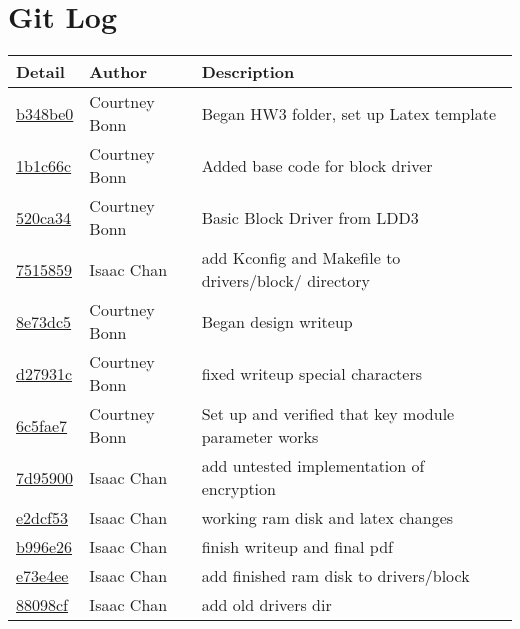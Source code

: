 \documentclass[letterpaper,10pt,draftclsnofoot,onecolumn,titlepage]{IEEEtran}
\begin{document}
\section{Git Log}
\begin{tabular}{p{2cm} p{2cm} p{10cm}}\textbf{Detail} & \textbf{Author} & \textbf{Description}\\\hline
\href{https://github.com/courtbonn/CS-444/commit/b348be011039919dca829df4eaad800878b1dd67}{b348be0} & Courtney Bonn & Began HW3 folder, set up Latex template\\\hline
\href{https://github.com/courtbonn/CS-444/commit/1b1c66c0c18c9fd4e39fa502cc5c9701fb45a24d}{1b1c66c} & Courtney Bonn & Added base code for block driver\\\hline
\href{https://github.com/courtbonn/CS-444/commit/520ca3498f923a4fd12550fa8845b625c40c680a}{520ca34} & Courtney Bonn & Basic Block Driver from LDD3\\\hline
\href{https://github.com/courtbonn/CS-444/commit/75158597cdb33b209c616ac2ad15ead814d9c1f8}{7515859} & Isaac Chan & add Kconfig and Makefile to drivers/block/ directory\\\hline
\href{https://github.com/courtbonn/CS-444/commit/8e73dc53cb9aca0eca5b2cbb14595ceb1aca4ee6}{8e73dc5} & Courtney Bonn & Began design writeup\\\hline
\href{https://github.com/courtbonn/CS-444/commit/d27931ca8705c187f60d5bb95d3cde3ce3f10fe7}{d27931c} & Courtney Bonn & fixed writeup special characters\\\hline
\href{https://github.com/courtbonn/CS-444/commit/6c5fae7224e62f21df0fcd3847bfb02e2faf9eb7}{6c5fae7} & Courtney Bonn & Set up and verified that key module parameter works\\\hline
\href{https://github.com/courtbonn/CS-444/commit/7d95900a7c4ea8c34f3dce10276eea1274363441}{7d95900} & Isaac Chan & add untested implementation of encryption\\\hline
\href{https://github.com/courtbonn/CS-444/commit/e2dcf53f318e52afbfffbfff12a7e20fda911c7a}{e2dcf53} & Isaac Chan & working ram disk and latex changes\\\hline
\href{https://github.com/courtbonn/CS-444/commit/b996e2637fc2e9ee61f8643b3151e92b00fcb233}{b996e26} & Isaac Chan & finish writeup and final pdf\\\hline
\href{https://github.com/courtbonn/CS-444/commit/e73e4ee7bb59b079e4e108afa2977dd00ce167a0}{e73e4ee} & Isaac Chan & add finished ram disk to drivers/block\\\hline
\href{https://github.com/courtbonn/CS-444/commit/88098cfb24bcda5623f10e8ed7afb3e01be0b2fc}{88098cf} & Isaac Chan & add old drivers dir\\\hline

\end{tabular}
\end{document}
